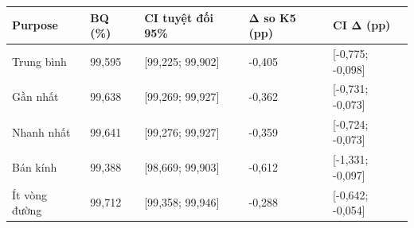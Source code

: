 \par\smallskip\noindent\begin{tabularx}{\linewidth}{@{}P{3.1cm}XXXX@{}}\toprule
\textbf{Purpose} & \textbf{BQ (\%)} & \textbf{CI tuyệt đối 95\%} & \textbf{Δ so K5 (pp)} & \textbf{CI Δ (pp)} \\
\midrule
Trung bình & 99{,}595 & [99{,}225; 99{,}902] & -0{,}405 & [-0{,}775; -0{,}098] \\
Gần nhất & 99{,}638 & [99{,}269; 99{,}927] & -0{,}362 & [-0{,}731; -0{,}073] \\
Nhanh nhất & 99{,}641 & [99{,}276; 99{,}927] & -0{,}359 & [-0{,}724; -0{,}073] \\
Bán kính & 99{,}388 & [98{,}669; 99{,}903] & -0{,}612 & [-1{,}331; -0{,}097] \\
Ít vòng đường & 99{,}712 & [99{,}358; 99{,}946] & -0{,}288 & [-0{,}642; -0{,}054] \\
\bottomrule\end{tabularx}\par\smallskip
